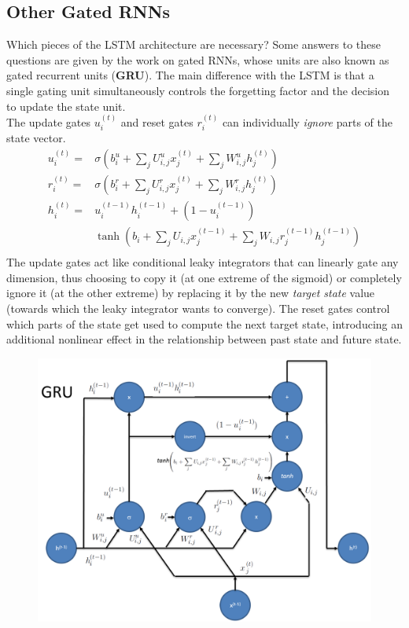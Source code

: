 \begin{multicols}{2}
	\subsection{Other Gated RNNs}
	Which pieces of the LSTM architecture are necessary?
	Some answers to these questions are given by the work on gated RNNs, whose units are also known as gated recurrent units (\textbf{GRU}).
	The main difference with the LSTM is that a single gating unit simultaneously controls the forgetting factor and the decision to update the state unit.\\
	
	The update gates $u_i^{(t)}$ and reset gates $r_i^{(t)}$ can individually \emph{ignore} parts of the state vector.
	\begin{align*}
	u_i^{(t)} =& \sigma\left( b_i^u+\sum_j U_{i,j}^ux_j^{(t)}+\sum_j W_{i,j}^uh_j^{(t)} \right)\\
	r_i^{(t)} =& \sigma\left( b_i^r+\sum_j U_{i,j}^rx_j^{(t)}+\sum_j W_{i,j}^rh_j^{(t)} \right)\\
	h_i^{(t)} =& u_i^{(t-1)}h_i^{(t-1)} +(1-u_i^{(t-1)}) \\
	&\tanh \left( b_i+\sum_j U_{i,j}x_j^{(t-1)}+\sum_j W_{i,j}r_j^{(t-1)}h_j^{(t-1)} \right)\\
	\end{align*}
	\columnbreak
	The update gates act like conditional leaky integrators that can linearly gate any dimension, thus choosing to copy it (at one extreme of the sigmoid) or completely ignore it (at the other extreme) by replacing it by the new \emph{target state} value (towards which the leaky integrator wants to converge).
	The reset gates control which parts of the state get used to compute the next target state, introducing an additional nonlinear effect in the relationship between past state and future state.
	\begin{figure}[H]
		\centering
		\includegraphics[width=1.05\linewidth]{images/gru.PNG}
	\end{figure}

\end{multicols}
